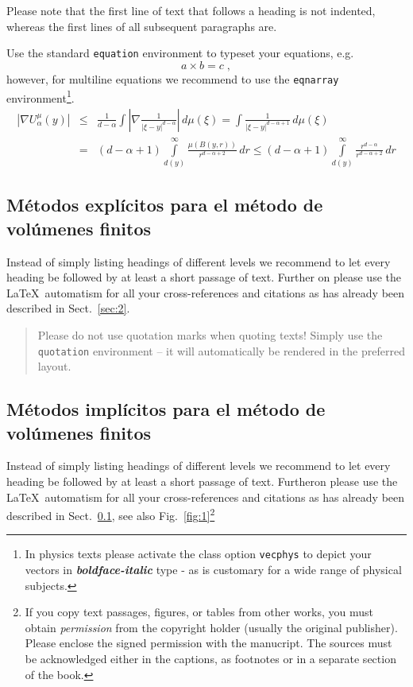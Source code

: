 Please note that the first line of text that follows a heading is not indented, whereas the first lines of all subsequent paragraphs are.

\eject

Use the standard \verb|equation| environment to typeset your equations, e.g.
%
\begin{equation}
    a \times b = c\;,
\end{equation}
%
however, for multiline equations we recommend to use the \verb|eqnarray| environment\footnote{In physics texts please activate the class option \texttt{vecphys} to depict your vectors in \textbf{\itshape boldface-italic} type - as is customary for a wide range of physical subjects.}.
\begin{eqnarray}
    \left|\nabla U_{\alpha}^{\mu}(y)\right| &\le&\frac1{d-\alpha}\int
    \left|\nabla\frac1{|\xi-y|^{d-\alpha}}\right|\,d\mu(\xi) =
    \int \frac1{|\xi-y|^{d-\alpha+1}} \,d\mu(\xi)\qquad  \\
    &=&(d-\alpha+1) \int\limits_{d(y)}^\infty
    \frac{\mu(B(y,r))}{r^{d-\alpha+2}}\,dr \le (d-\alpha+1)
    \int\limits_{d(y)}^\infty \frac{r^{d-\alpha}}{r^{d-\alpha+2}}\,dr
    \label{eq:01}
\end{eqnarray}

\enlargethispage{24pt}

\subsection{Métodos explícitos para el método de volúmenes finitos}
\label{subsec:2}
Instead of simply listing headings of different levels we recommend to let every heading be followed by at least a short passage of text. Further on please use the \LaTeX\ automatism for all your cross-references and citations as has already been described in Sect.~\ref{sec:2}.

\begin{quotation}
    Please do not use quotation marks when quoting texts! Simply use the \verb|quotation| environment -- it will automatically be rendered in the preferred layout.
\end{quotation}


\subsection{Métodos implícitos para el método de volúmenes finitos}
Instead of simply listing headings of different levels we recommend to let every heading be followed by at least a short passage of text. Furtheron please use the \LaTeX\ automatism for all your cross-references and citations as has already been described in Sect.~\ref{subsec:2}, see also Fig.~\ref{fig:1}\footnote{If you copy text passages, figures, or tables from other works, you must obtain \textit{permission} from the copyright holder (usually the original publisher). Please enclose the signed permission with the manucript. The sources must be acknowledged either in the captions, as footnotes or in a separate section of the book.}

